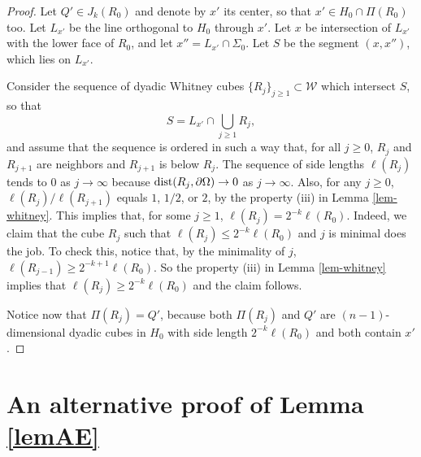 \documentclass[11pt]{amsart}
\newcommand{\WW}{{\mathcal W}}
\newcommand{\dist}{{\rm dist}}
\newcommand{\vv}{{\vspace{2mm}}}
\theoremstyle{definition}
\theoremstyle{remark}
\numberwithin{equation}{section}
\begin{document}
\begin{proof}
Let $Q'\in J_k(R_0)$ and denote by $x'$ its center, so that $x'\in H_0\cap\Pi(R_0)$ too.
Let $L_{x'}$ be the line orthogonal to $H_0$ through $x'$. Let $x$ be intersection of $L_{x'}$ with the lower face of $R_0$, and let $x''=L_{x'}\cap \Sigma_0$. 
Let $S$ be the segment $(x,x'')$, which lies on $L_{x'}$.

Consider the sequence of dyadic Whitney cubes $\{R_j\}_{j\geq1}\subset \WW$ which intersect $S$,
so that 
$$S= L_{x'}\cap\bigcup_{j\geq 1} R_j,$$
and assume that the sequence is ordered in such a way that, for all $j\geq0$, $R_j$ and $R_{j+1}$ are neighbors and $R_{j+1}$ is below $R_j$.
The sequence of side lengths $\ell(R_j)$ tends to $0$ as $j\to\infty$ because
$\dist(R_j,\partial\Omega)\to0$ as $j\to\infty$. Also, for any $j\geq0$, $\ell(R_j) / \ell(R_{j+1})$ 
equals $1$, $1/2$, or $2$, by the property (iii) in Lemma \ref{lem-whitney}.
This implies that, for some $j\geq1$, $\ell(R_j)=2^{-k}\ell(R_0)$. Indeed, we claim that
 the cube $R_j$ such that $\ell(R_j) \leq 2^{-k} \ell(R_0)$ and $j$ is minimal does the job. To check this, notice that, by the minimality of $j$, $\ell(R_{j-1}) \geq 2^{-k+1} \ell(R_0)$. So the property (iii) in Lemma \ref{lem-whitney}
implies that $\ell(R_j)\geq  2^{-k} \ell(R_0)$ and the claim follows.

Notice now that $\Pi(R_j)=Q'$, because both $\Pi(R_j)$ and $Q'$ are $(n-1)$-dimensional dyadic cubes in $H_0$ with side length $2^{-k}\ell(R_0)$ and both contain $x'$.
\end{proof}
\vv



\section{An alternative proof of Lemma \ref{lemAE}}\label{app3}
\end{document}
